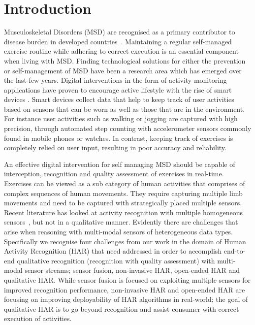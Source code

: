 \documentclass[runningheads]{llncs}
\begin{document}
\section{Introduction}
\label{sec:intro}
Musculoskeletal Disorders (MSD) are recognised as a primary contributor to disease burden in developed countries~\cite{abajobir2017global}. 
Maintaining a regular self-managed exercise routine while adhering to correct execution is an essential component when living with MSD.
Finding technological solutions for either the prevention or self-management of MSD have been a research area which has emerged over the last few years.
Digital interventions in the form of activity monitoring applications have proven to encourage active lifestyle with the rise of smart devices \cite{fanning2012increasing}. Smart devices collect data that help to keep track of user activities based on sensors that can be worn as well as those that are in the environment. For instance user activities such as walking or jogging are captured with high precision, through automated step counting with accelerometer sensors commonly found in mobile phones or watches. In contrast, keeping track of exercises is completely relied on user input, resulting in poor accuracy and reliability. 

An effective digital intervention for self managing MSD should be capable of interception, recognition and quality assessment of exercises in real-time. 
Exercises can be viewed as a sub category of human activities that comprises of complex sequences of human movements. They require capturing multiple limb movements and need to be captured with strategically placed multiple sensors. Recent literature has looked at activity recognition with multiple homogeneous sensors~\cite{yao2017deepsense,radu2016towards,ordonez2016deep}, but not in a qualitative manner. Evidently there are challenges that arise when reasoning with multi-modal sensors of heterogeneous data types. Specifically we recognise four challenges from our work in the domain of Human Activity Recognition (HAR) that need addressed in order to accomplish end-to-end qualitative recognition (recognition with quality assessment) with multi-modal sensor streams; sensor fusion, non-invasive HAR, open-ended HAR and qualitative HAR. 
While sensor fusion is focused on exploiting multiple sensors for improved recognition performance, non-invasive HAR and open-ended HAR are focusing on improving deployability of HAR algorithms in real-world; the goal of qualitative HAR is to go beyond recognition and assist consumer with correct execution of activities.  
\end{document}
